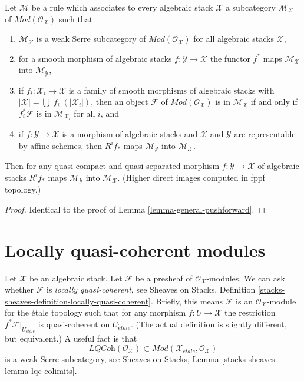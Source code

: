 \begin{lemma}
\label{lemma-general-pushforward-fppf}
Let $\mathcal{M}$ be a rule which associates to every algebraic stack
$\mathcal{X}$ a subcategory $\mathcal{M}_\mathcal{X}$ of
$\textit{Mod}(\mathcal{O}_\mathcal{X})$
such that
\begin{enumerate}
\item $\mathcal{M}_\mathcal{X}$ is a weak Serre subcategory
of $\textit{Mod}(\mathcal{O}_\mathcal{X})$
for all algebraic stacks $\mathcal{X}$,
\item for a smooth morphism of algebraic stacks
$f : \mathcal{Y} \to \mathcal{X}$ the functor $f^*$ maps
$\mathcal{M}_\mathcal{X}$ into $\mathcal{M}_\mathcal{Y}$,
\item if $f_i : \mathcal{X}_i \to \mathcal{X}$ is a family of smooth
morphisms of algebraic stacks with
$|\mathcal{X}| = \bigcup |f_i|(|\mathcal{X}_i|)$, then an object
$\mathcal{F}$ of $\textit{Mod}(\mathcal{O}_\mathcal{X})$
is in $\mathcal{M}_\mathcal{X}$ if and only if
$f_i^*\mathcal{F}$ is in $\mathcal{M}_{\mathcal{X}_i}$ for all $i$, and
\item if $f : \mathcal{Y} \to \mathcal{X}$ is a morphism of algebraic
stacks and $\mathcal{X}$ and $\mathcal{Y}$ are representable
by affine schemes, then $R^if_*$ maps $\mathcal{M}_\mathcal{Y}$
into $\mathcal{M}_\mathcal{X}$.
\end{enumerate}
Then for any quasi-compact and quasi-separated morphism 
$f : \mathcal{Y} \to \mathcal{X}$ of algebraic stacks
$R^if_*$ maps $\mathcal{M}_\mathcal{Y}$
into $\mathcal{M}_\mathcal{X}$. (Higher direct images computed in fppf
topology.)
\end{lemma}

\begin{proof}
Identical to the proof of Lemma \ref{lemma-general-pushforward}.
\end{proof}


\section{Locally quasi-coherent modules}
\label{section-locally-quasi-coherent}

\noindent
Let $\mathcal{X}$ be an algebraic stack. Let $\mathcal{F}$ be a presheaf
of $\mathcal{O}_\mathcal{X}$-modules. We can ask whether $\mathcal{F}$
is {\it locally quasi-coherent}, see
Sheaves on Stacks, Definition
\ref{stacks-sheaves-definition-locally-quasi-coherent}.
Briefly, this means $\mathcal{F}$ is an $\mathcal{O}_\mathcal{X}$-module
for the \'etale topology such that for any morphism $f : U \to \mathcal{X}$
the restriction $f^*\mathcal{F}|_{U_{\acute{e}tale}}$ is quasi-coherent
on $U_{\acute{e}tale}$. (The actual definition is slightly different, but
equivalent.) A useful fact is that
$$
\textit{LQCoh}(\mathcal{O}_\mathcal{X}) \subset
\textit{Mod}(\mathcal{X}_{\acute{e}tale}, \mathcal{O}_\mathcal{X})
$$
is a weak Serre subcategory, see
Sheaves on Stacks, Lemma \ref{stacks-sheaves-lemma-lqc-colimits}.


